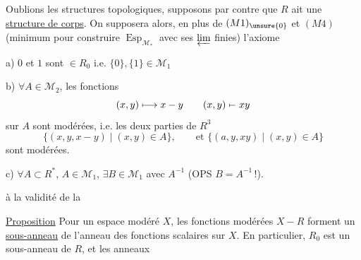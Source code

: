 Oublions les structures topologiques, supposons par contre que $R$ ait une \uline{structure de corps}. On supposera alors,  en plus de $(M1)_{\unsure{0}}$ et $(M4)$ (minimum pour construire $\operatorname{Esp}_{\mathcal M_*}$ avec ses $\varprojlim$ finies) l'axiome


a) $0$ et $1$ sont $\in R_0$ i.e. $\{0\},\{1\}\in\mathcal M_1$

b) $\forall A\in\mathcal M_2$, les fonctions
\[
 (x,y)\longmapsto x-y\qquad
 (x,y)\mathrel{\mapstochar\relbar}xy
\]
sur $A$ sont modérées,  i.e. les deux parties de $R^3$
\[
 \{(x,y,x-y)\mid(x,y)\in A\},\qquad\text{et }\{(a,y,xy)\mid(x,y)\in A\}
\]
sont modérées.

c) $\forall A\subset R^*$, $A\in\mathcal M_1$, $\exists B\in\mathcal M_1$ avec $A^{-1}$  (OPS $B=A^{-1}$\,!).

    à la validité de la


\uline{Proposition} Pour un espace modéré $X$, les fonctions modérées $X\mathbin{-}R$  forment un \uline{sous-anneau} de l'anneau des fonctions scalaires sur $X$. En particulier, $R_0$ est un sous-anneau de $R$, et les anneaux
